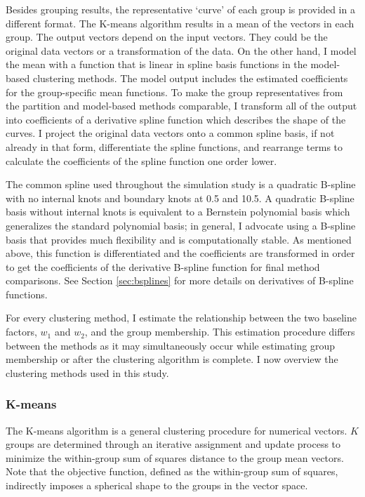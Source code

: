 Besides grouping results, the representative `curve' of each group is provided in a different format. The K-means algorithm results in a mean of the vectors in each group. The output vectors depend on the input vectors. They could be the original data vectors or a transformation of the data. On the other hand, I model the mean with a function that is linear in spline basis functions in the model-based clustering methods. The model output includes the estimated coefficients for the group-specific mean functions. To make the group representatives from the partition and model-based methods comparable, I transform all of the output into coefficients of a derivative spline function which describes the shape of the curves. I project the original data vectors onto a common spline basis, if not already in that form, differentiate the spline functions, and rearrange terms to calculate the coefficients of the spline function one order lower. 

The common spline used throughout the simulation study is a quadratic B-spline with no internal knots and boundary knots at 0.5 and 10.5. A quadratic B-spline basis without internal knots is equivalent to a Bernstein polynomial basis \cite{lorentz1953} which generalizes the standard polynomial basis; in general, I advocate using a B-spline basis that provides much flexibility and is computationally stable.  As mentioned above, this function is differentiated and the coefficients are transformed in order to get the coefficients of the derivative B-spline function for final method comparisons. See Section \ref{sec:bsplines} for more details on derivatives of B-spline functions.

For every clustering method, I estimate the relationship between the two baseline factors, $w_{1}$ and $w_{2}$, and the group membership. This estimation procedure differs between the methods as it may simultaneously occur while estimating group membership or after the clustering algorithm is complete. I now overview the clustering methods used in this study.

\subsubsection{K-means}
The K-means algorithm is a general clustering procedure for numerical vectors. $K$ groups are determined through an iterative assignment and update process to minimize the within-group sum of squares distance to the group mean vectors. Note that the objective function, defined as the within-group sum of squares, indirectly imposes a spherical shape to the groups in the vector space.

